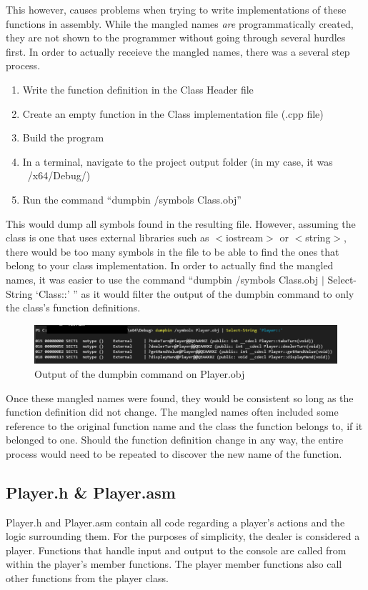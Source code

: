 \documentclass[twoside]{article}
\begin{document}
    \bigbreak
    \noindent
    This however, causes problems when trying to write implementations of these functions in assembly.
    While the mangled names \emph{are} programmatically created, they are not shown to the programmer without going through several hurdles first.
    In order to actually receieve the mangled names, there was a several step process.
    \begin{enumerate}
        \item Write the function definition in the Class Header file
        \item Create an empty function in the Class implementation file (.cpp file)
        \item Build the program
        \item In a terminal, navigate to the project output folder (in my case, it was ~/x64/Debug/)
        \item Run the command ``dumpbin /symbols Class.obj''
    \end{enumerate}
    This would dump all symbols found in the resulting file.
    However, assuming the class is one that uses external libraries such as $<$iostream$>$ or $<$string$>$, there would be too many symbols in the file to be able to find the ones that belong to your class implementation.
    In order to actually find the mangled names, it was easier to use the command ``dumpbin /symbols Class.obj $|$ Select-String `Class::' '' as it would filter the output of the dumpbin command to only the class's function definitions.

    \begin{figure}[hbtp]
        \centering
        \includegraphics[scale=4]{dumpbin}
        \caption {Output of the dumpbin command on Player.obj}
        \label{fig:Dumpbin}
    \end{figure}

    \noindent
    Once these mangled names were found, they would be consistent so long as the function definition did not change.
    The mangled names often included some reference to the original function name and the class the function belongs to, if it belonged to one.
    Should the function definition change in any way, the entire process would need to be repeated to discover the new name of the function.

    \subsection{Player.h \& Player.asm}\label{subsec:player.h-&-player.asm}
    Player.h and Player.asm contain all code regarding a player's actions and the logic surrounding them.
    For the purposes of simplicity, the dealer is considered a player.
    Functions that handle input and output to the console are called from within the player's member functions.
    The player member functions also call other functions from the player class.
\end{document}
